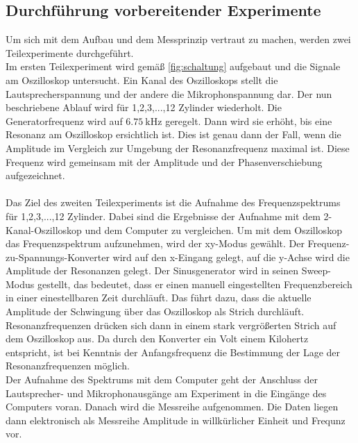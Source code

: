 \subsection{Durchführung vorbereitender Experimente}
\label{subsec:durchfuehrungVorbereitender}
Um sich mit dem Aufbau und dem Messprinzip vertraut zu machen, werden zwei Teilexperimente durchgeführt.\\
Im ersten Teilexperiment wird gemäß \ref{fig:schaltung} aufgebaut und die Signale am Oszilloskop untersucht. Ein Kanal des Oszilloskops stellt die Lautsprecherspannung und der andere die Mikrophonspannung dar. Der nun beschriebene Ablauf wird für 1,2,3,...,12 Zylinder wiederholt. Die Generatorfrequenz wird auf $\SI{6.75}{\kilo\hertz}$ geregelt. Dann wird sie erhöht, bis eine Resonanz am Oszilloskop ersichtlich ist. Dies ist genau dann der Fall, wenn die Amplitude im Vergleich zur Umgebung der Resonanzfrequenz maximal ist. Diese Frequenz wird gemeinsam mit der Amplitude und der Phasenverschiebung aufgezeichnet.\\\\
Das Ziel des zweiten Teilexperiments ist die Aufnahme des Frequenzspektrums für 1,2,3,...,12 Zylinder. Dabei sind die Ergebnisse der Aufnahme mit dem 2-Kanal-Oszilloskop und dem Computer zu vergleichen. Um mit dem Oszilloskop das Frequenzspektrum aufzunehmen, wird der xy-Modus gewählt. Der Frequenz-zu-Spannungs-Konverter wird auf den x-Eingang gelegt, auf die y-Achse wird die Amplitude der Resonanzen gelegt.
Der Sinusgenerator wird in seinen Sweep-Modus gestellt, das bedeutet, dass er einen manuell eingestellten Frequenzbereich in einer einestellbaren Zeit durchläuft. Das führt dazu, dass die aktuelle Amplitude der Schwingung über das Oszilloskop als Strich durchläuft. Resonanzfrequenzen drücken sich dann in einem stark vergrößerten Strich auf dem Oszilloskop aus. Da durch den Konverter ein Volt einem Kilohertz entspricht, ist bei Kenntnis der Anfangsfrequenz die Bestimmung der Lage der Resonanzfrequenzen möglich.\\
Der Aufnahme des Spektrums mit dem Computer geht der Anschluss der Lautsprecher- und Mikrophonausgänge am Experiment in die Eingänge des Computers voran. Danach wird die Messreihe aufgenommen. Die Daten liegen dann elektronisch als Messreihe Amplitude in willkürlicher Einheit und Frequnz vor.

